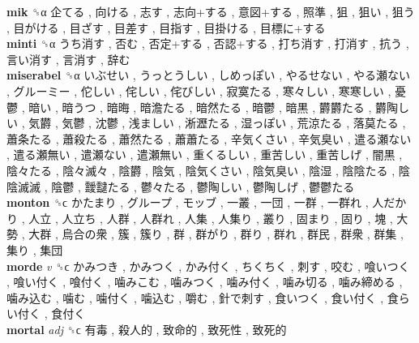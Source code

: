 \textbf{mik} ␝α   企てる ,  向ける ,  志す ,  志向+する ,  意図+する ,  照準 ,  狙 ,  狙い ,  狙う ,  目がける ,  目ざす ,  目差す ,  目指す ,  目掛ける ,  目標に+する   \\
\textbf{minti} ␝α   うち消す ,  否む ,  否定+する ,  否認+する ,  打ち消す ,  打消す ,  抗う ,  言い消す ,  言消す ,  辞む   \\
\textbf{miserabel} ␝α   いぶせい ,  うっとうしい ,  しめっぽい ,  やるせない ,  やる瀬ない ,  グルーミー ,  佗しい ,  侘しい ,  侘びしい ,  寂寞たる ,  寒々しい ,  寒寒しい ,  憂鬱 ,  暗い ,  暗うつ ,  暗晦 ,  暗澹たる ,  暗然たる ,  暗鬱 ,  暗黒 ,  欝欝たる ,  欝陶しい ,  気欝 ,  気鬱 ,  沈鬱 ,  浅ましい ,  淅瀝たる ,  湿っぽい ,  荒涼たる ,  落莫たる ,  蕭条たる ,  蕭殺たる ,  蕭然たる ,  蕭蕭たる ,  辛気くさい ,  辛気臭い ,  遣る瀬ない ,  遣る瀬無い ,  遣瀬ない ,  遣瀬無い ,  重くるしい ,  重苦しい ,  重苦しげ ,  闇黒 ,  陰々たる ,  陰々滅々 ,  陰欝 ,  陰気 ,  陰気くさい ,  陰気臭い ,  陰湿 ,  陰陰たる ,  陰陰滅滅 ,  陰鬱 ,  靉靆たる ,  鬱々たる ,  鬱陶しい ,  鬱陶しげ ,  鬱鬱たる   \\
\textbf{monton} ␝ϲ   かたまり ,  グループ ,  モッブ ,  一叢 ,  一団 ,  一群 ,  一群れ ,  人だかり ,  人立 ,  人立ち ,  人群 ,  人群れ ,  人集 ,  人集り ,  叢り ,  固まり ,  固り ,  塊 ,  大勢 ,  大群 ,  烏合の衆 ,  簇 ,  簇り ,  群 ,  群がり ,  群り ,  群れ ,  群民 ,  群衆 ,  群集 ,  集り ,  集団   \\
\textbf{morde} \emph{v}  ␝ϲ   かみつき ,  かみつく ,  かみ付く ,  ちくちく ,  刺す ,  咬む ,  喰いつく ,  喰い付く ,  喰付く ,  噛みこむ ,  噛みつく ,  噛み付く ,  噛み切る ,  噛み締める ,  噛み込む ,  噛む ,  噛付く ,  噛込む ,  嚼む ,  針で刺す ,  食いつく ,  食い付く ,  食らい付く ,  食付く   \\
\textbf{mortal} \emph{adj}  ␝ϲ   有毒 ,  殺人的 ,  致命的 ,  致死性 ,  致死的   \\
